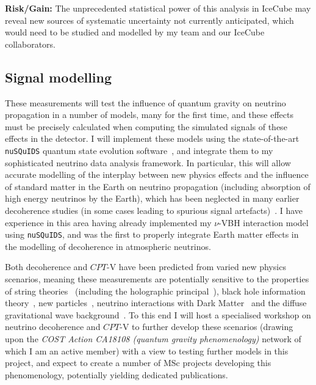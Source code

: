 \documentclass[a4paper,11pt]{article}
\begin{document}
\textbf{Risk/Gain:} The unprecedented statistical power of this analysis in IceCube may reveal new sources of systematic uncertainty not currently anticipated, which would need to be studied and modelled by my team and our IceCube collaborators. \\

\subsection{Signal modelling}

These measurements will test the influence of quantum gravity on neutrino propagation in a number of models, many for the first time, and these effects must be precisely calculated when computing the simulated signals of these effects in the detector. I will implement these models using the state-of-the-art \texttt{nuSQuIDS} quantum state evolution software~\cite{Delgado:2014kpa, nusquidsGIT}, and integrate them to my sophisticated neutrino data analysis framework. In particular, this will allow accurate modelling of the interplay between new physics effects and the influence of standard matter in the Earth on neutrino propagation (including absorption of high energy neutrinos by the Earth), which has been neglected in many earlier decoherence studies (in some cases leading to spurious signal artefacts)~\cite{PhysRevD.97.115017}. I have experience in this area having already implemented my $\nu$-VBH interaction model using \texttt{nuSQuIDS}, and was the first to properly integrate Earth matter effects in the modelling of decoherence in atmospheric neutrinos.

Both decoherence and $CPT$-V have been predicted from varied new physics scenarios, meaning these measurements are potentially sensitive to the properties of string theories~\cite{Mavromatos2010, AmelinoCamelia:2008qg} (including the holographic principal~\cite{Perlman_2015, Harlow:2018jwu}), black hole information theory~\cite{PhysRevD.102.115003, Hellmann:2021jyz}, new particles~\cite{Hellmann:2021jyz}, neutrino interactions with Dark Matter~\cite{1909.11271, EPJC802020, Capozzi:2018bps, 1904.02518} and the diffuse gravitational wave background~\cite{PhysRevD.100.096014}. To this end I will host a specialised workshop on neutrino decoherence and $CPT$-V to further develop these scenarios (drawing upon the \textit{COST Action CA18108 (quantum gravity phenomenology)} network of which I am an active member) with a view to testing further models in this project, and expect to create a number of MSc projects developing this phenomenology, potentially yielding dedicated publications.
\end{document}
